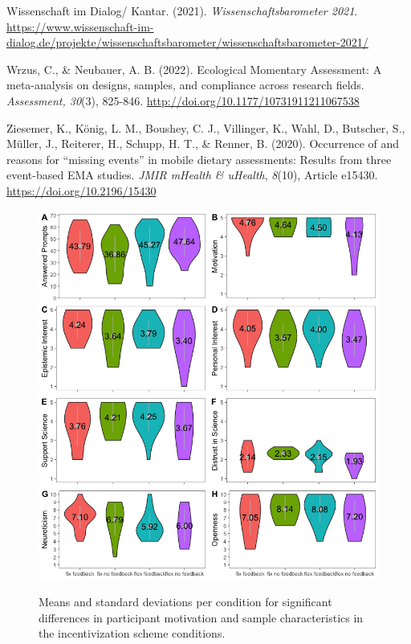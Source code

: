 \documentclass[authordate, empirical]{jote-new-article}
\begin{document}
	Wissenschaft im Dialog/ Kantar. (2021). \emph{Wissenschaftsbarometer 2021}. \url{https://www.wissenschaft-im-dialog.de/projekte/wissenschaftsbarometer/wissenschaftsbarometer-2021/}



	Wrzus, C., \& Neubauer, A. B. (2022). Ecological Momentary Assessment: A meta-analysis on designs, samples, and compliance across research fields. \emph{Assessment, 30}(3), 825-846. \href{http://doi.org/10.1177/10731911211067538}{http://doi.org/10.1177/10731911211067538}



	Ziesemer, K., König, L. M., Boushey, C. J., Villinger, K., Wahl, D., Butscher, S., Müller, J., Reiterer, H., Schupp, H. T., \& Renner, B. (2020). Occurrence of and reasons for “missing events” in mobile dietary assessments: Results from three event-based EMA studies. \emph{JMIR mHealth \& uHealth},\emph{ 8}(10), Article e15430. \href{https://doi.org/10.2196/15430}{https://doi.org/10.2196/15430}







	\pagebreak

	\begin{figure}
		\begin{fullwidth}
			
		\caption{Means and standard deviations per condition for significant differences in participant motivation and sample characteristics in the incentivization scheme conditions.}
		\includegraphics[width=\linewidth]{media/image1.png}


		\label{fig:rId35}
	\end{fullwidth}


	\end{figure}
\end{document}
